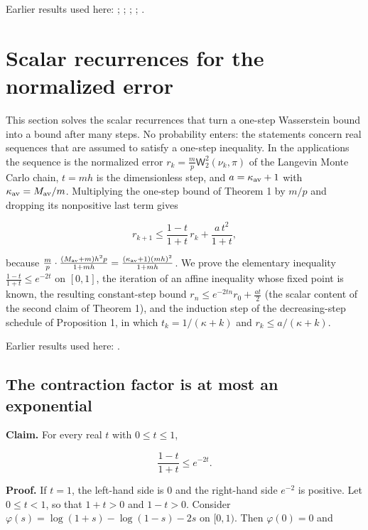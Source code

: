 \documentclass[11pt,a4paper]{report}
\begin{document}
Earlier results used here: \cite[Section~3.17.3]{LangevinLean2026ULASC}; \cite[Section~3.17.4]{LangevinLean2026ULASC}; \cite[Section~3.18.2]{LangevinLean2026ULASC}; \cite[Section~3.26.3]{LangevinLean2026ULASC}; \cite[Section~3.36.7]{LangevinLean2026ULASC}.
\section{\texorpdfstring{Scalar recurrences for the normalized error}{Scalar recurrences for the normalized error}}
\label{proof-module-AverageLMC-Recurrence-lean}


This section solves the scalar recurrences that turn a one-step Wasserstein bound into a bound after many steps. No probability enters: the statements concern real sequences that are assumed to satisfy a one-step inequality. In the applications the sequence is the normalized error \(r_k=\frac mp\mathsf W_2^2(\nu_k,\pi)\) of the Langevin Monte Carlo chain, \(t=mh\) is the dimensionless step, and \(a=\kappa_{\rm av}+1\) with \(\kappa_{\rm av}=M_{\rm av}/m\). Multiplying the one-step bound of Theorem 1 by \(m/p\) and dropping its nonpositive last term gives


\[r_{k+1}\le\frac{1-t}{1+t}\,r_k+\frac{a\,t^2}{1+t},\]


because \(\frac mp\cdot\frac{(M_{\rm av}+m)h^2p}{1+mh}=\frac{(\kappa_{\rm av}+1)(mh)^2}{1+mh}\). We prove the elementary inequality \(\frac{1-t}{1+t}\le e^{-2t}\) on \([0,1]\), the iteration of an affine inequality whose fixed point is known, the resulting constant-step bound \(r_n\le e^{-2tn}r_0+\frac{at}2\) (the scalar content of the second claim of Theorem 1), and the induction step of the decreasing-step schedule of Proposition 1, in which \(t_k=1/(\kappa+k)\) and \(r_k\le a/(\kappa+k)\).



Earlier results used here: \cite[Section~3.15]{LangevinLean2026ULASC}.
\subsection{\texorpdfstring{The contraction factor is at most an exponential}{The contraction factor is at most an exponential}}
\label{report-step-AverageLMC-Recurrence-lean-1}


\textbf{Claim.} For every real \(t\) with \(0\le t\le1\),


\[\frac{1-t}{1+t}\le e^{-2t}.\]


\textbf{Proof.} If \(t=1\), the left-hand side is \(0\) and the right-hand side \(e^{-2}\) is positive. Let \(0\le t<1\), so that \(1+t>0\) and \(1-t>0\). Consider \(\varphi(s)=\log(1+s)-\log(1-s)-2s\) on \([0,1)\). Then \(\varphi(0)=0\) and
\end{document}
